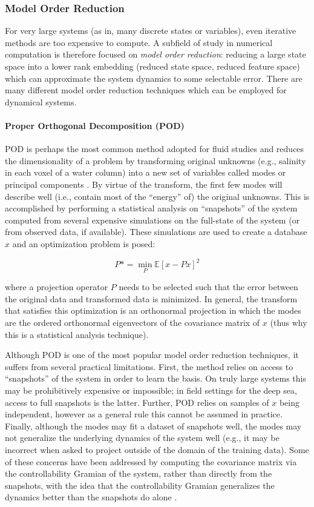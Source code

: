 \subsubsection{Model Order Reduction}
For very large systems (as in, many discrete states or variables), even iterative methods are too expensive to compute. A subfield of study in numerical computation is therefore focused on \emph{model order reduction}: reducing a large state space into a lower rank embedding (reduced state space, reduced feature space) which can approximate the system dynamics to some selectable error. There are many different model order reduction techniques which can be employed for dynamical systems.

\paragraph{Proper Orthogonal Decomposition (POD)} POD is perhaps the most common method adopted for fluid studies and reduces the dimensionality of a problem by transforming original unknowns (e.g., salinity in each voxel of a water column) into a new set of variables called modes or principal components \autocite{lassila2014model}. By virtue of the transform, the first few modes will describe well (i.e., contain most of the ``energy'' of) the original unknowns. This is accomplished by performing a statistical analysis on ``snapshots'' of the system computed from several expensive simulations on the full-state of the system (or from observed data, if available). These simulations are used to create a database $x$  and an optimization problem is posed:

\begin{equation}
	P* = \min_P\mathbb{E}[x - Px]^2
\end{equation}

\noindent where a projection operator $P$ needs to be selected such that the error between the original data and transformed data is minimized. In general, the transform that satisfies this optimization is an orthonormal projection in which the modes are the ordered orthonormal eigenvectors of the covariance matrix of $x$ (thus why this is a statistical analysis technique).

Although POD is one of the most popular model order reduction techniques, it suffers from several practical limitations. First, the method relies on access to ``snapshots'' of the system in order to learn the basis.  On truly large systems this may be prohibitively expensive or impossible; in field settings for the deep sea, access to full snapshots is the latter. Further, POD relies on samples of $x$ being independent, however as a general rule this cannot be assumed in practice. Finally, although the modes may fit a dataset of snapshots well, the modes may not generalize the underlying dynamics of the system well (e.g., it may be incorrect when asked to project outside of the domain of the training data). Some of these concerns have been addressed by computing the covariance matrix via the controllability Gramian of the system, rather than directly from the snapshots, with the idea that the controllability Gramian generalizes the dynamics better than the snapshots do alone \autocite{georges1995use,zhao2019networks}.

